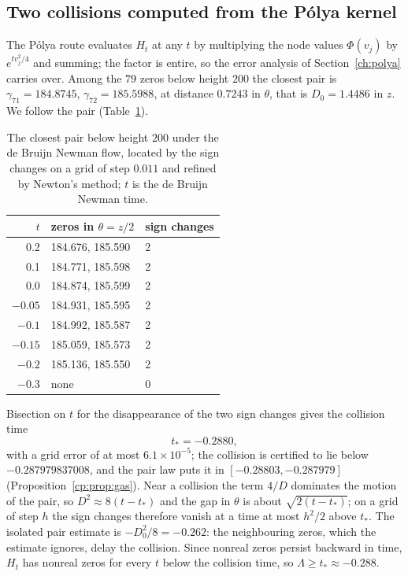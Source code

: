 \subsection{Two collisions computed from the P\'olya kernel}\label{sec:ch21:collisions}

The P\'olya route evaluates $H_t$ at any $t$ by multiplying the node values $\Phi(v_j)$ by $e^{tv_j^2/4}$ and summing; the factor is entire, so the error analysis of Section~\ref{ch:polya} carries over. Among the $79$ zeros below height $200$ the closest pair is $\gamma_{71}=184.8745$, $\gamma_{72}=185.5988$, at distance $0.7243$ in $\theta$, that is $D_0=1.4486$ in $z$. We follow the pair (Table~\ref{tab:ch21:traj}).

\begin{table}[htbp]
\centering\small
\begin{tabular}{rll}
\toprule
$t$ & zeros in $\theta=z/2$ & sign changes\\
\midrule
0.2 & 184.676, 185.590 & 2\\
0.1 & 184.771, 185.598 & 2\\
0.0 & 184.874, 185.599 & 2\\
$-0.05$ & 184.931, 185.595 & 2\\
$-0.1$ & 184.992, 185.587 & 2\\
$-0.15$ & 185.059, 185.573 & 2\\
$-0.2$ & 185.136, 185.550 & 2\\
$-0.3$ & none & 0\\
\bottomrule
\end{tabular}
\caption{The closest pair below height $200$ under the de Bruijn Newman flow, located by the sign changes on a grid of step $0.011$ and refined by Newton's method; $t$ is the de Bruijn Newman time.}
\label{tab:ch21:traj}
\end{table}

Bisection on $t$ for the disappearance of the two sign changes gives the collision time
\[
t_*=-0.2880,
\]
with a grid error of at most $6.1\times10^{-5}$; the collision is certified to lie below $-0.287979837008$, and the pair law puts it in $[-0.28803,-0.287979]$ (Proposition~\ref{cp:prop:gas}). Near a collision the term $4/D$ dominates the motion of the pair, so $D^2\approx8(t-t_*)$ and the gap in $\theta$ is about $\sqrt{2(t-t_*)}$; on a grid of step $h$ the sign changes therefore vanish at a time at most $h^2/2$ above $t_*$. The isolated pair estimate is $-D_0^2/8=-0.262$: the neighbouring zeros, which the estimate ignores, delay the collision. Since nonreal zeros persist backward in time, $H_t$ has nonreal zeros for every $t$ below the collision time, so $\Lambda\ge t_*\approx-0.288$.

